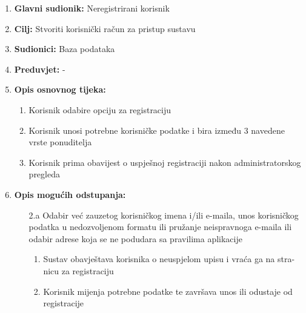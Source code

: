 \documentclass[12pt]{report}
\begin{document}
\noindent {}
\begin{enumerate}
	
	\item \textbf{Glavni sudionik: }Neregistrirani korisnik
	\item  \textbf{Cilj:} Stvoriti korisnički račun za pristup sustavu 
	\item  \textbf{Sudionici:} Baza podataka
	\item  \textbf{Preduvjet:} - 
	\item  \textbf{Opis osnovnog tijeka:}
	
	\begin{enumerate}
		
		\item Korisnik odabire opciju za registraciju
		\item Korisnik unosi potrebne korisničke podatke i bira između 3 navedene vrste ponuditelja
		\item Korisnik prima obavijest o uspješnoj registraciji nakon administratorskog pregleda
		
	\end{enumerate}
	
		
	\item  \textbf{Opis mogućih odstupanja:}
	
	\item[] \begin{enumerate}
		
		\item[2.a] Odabir već zauzetog korisničkog imena i/ili e-maila, unos korisničkog
		podatka u nedozvoljenom formatu ili pružanje neispravnoga e-maila ili odabir adrese koja se ne podudara sa pravilima aplikacije
		\item[] \begin{enumerate}
			
			\item Sustav obavještava korisnika o neuspjelom upisu i vraća ga na stra-
			nicu za registraciju
			\item Korisnik mijenja potrebne podatke te završava unos ili odustaje od registracije
			
		\end{enumerate}
		
	\end{enumerate}
	
\end{enumerate}
\end{document}
